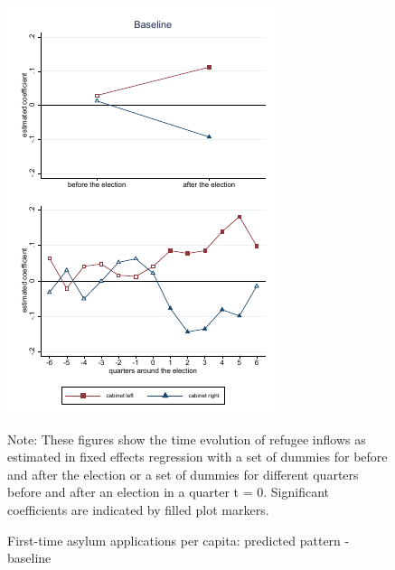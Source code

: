 \documentclass[11pt,a4paper]{scrartcl}
\begin{document}
\clearpage
\FloatBarrier


\clearpage
\FloatBarrier
\begin{figure}[!ht]
	
	\caption{First-time asylum applications per capita: predicted pattern - baseline}
	\centering
	\begin{minipage}{0.8\textwidth} 
		\includegraphics[width=\linewidth]{../results/applications/app_graphs_baseline.pdf}
		{\footnotesize Note: These figures show the time evolution of refugee inflows as estimated in fixed effects regression with a set of dummies for before and after the election or a set of dummies for different quarters before and after an election in a quarter t = 0. Significant coefficients are indicated by filled plot markers.\par}
	\end{minipage}
\end{figure}
\end{document}
